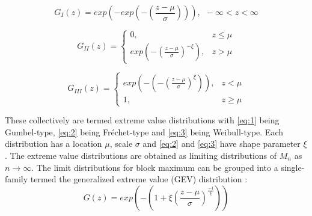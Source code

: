 \begin{equation}
    G_{I}(z) = exp\left(-exp\left(-\left(\frac{z-\mu}{\sigma}\right)\right)\right), \ \ -\infty < z < \infty
    \label{eq:1}
\end{equation}

\begin{equation}
    G_{II}(z) =
    \begin{cases}
        0,                                                           & z \leq \mu \\
        exp\left(-\left( \frac{z-\mu}{\sigma} \right)^{-\xi}\right), & z > \mu
    \end{cases}
    \label{eq:2}
\end{equation}

\begin{equation}
    G_{III}(z) =
    \begin{cases}
        exp\left(-\left( -\left(\frac{z-\mu}{\sigma} \right)^{\xi} \right) \right), & z < \mu    \\
        1,                                                                          & z \geq \mu
    \end{cases}
    \label{eq:3}
\end{equation}


These collectively are termed extreme value distributions with \ref{eq:1} being Gumbel-type, \ref{eq:2} being Fr\'echet-type and \ref{eq:3} being Weibull-type. Each distribution has a location $\mu$, scale $\sigma$ and \ref{eq:2} and \ref{eq:3} have shape parameter $\xi$. The extreme value distributions are obtained as limiting distributions of $M_n$ as $n \to \infty$. The limit distributions for block maximum can be grouped into a single-family termed the generalized extreme value (GEV) distribution \citep{dehaan2007extreme}:
\begin{equation}
    G(z) = exp\left(-\left(1+\xi\left(\frac{z-\mu}{\sigma}\right)^{\frac{-1}{\xi}}\right)\right)
    \label{eq:GEV}
\end{equation}


